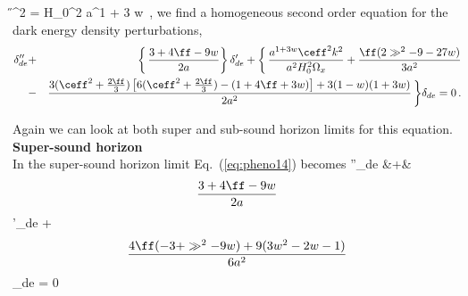 \be 
\H^2 = H_0^2  {a^{1 + 3 w}}\, ,
\ee 
we find a homogeneous second order equation for the dark energy density perturbations,
\begin{eqnarray}
\label{eq:pheno14}
\delta''_{de} &+&  \bigg\{\,  \frac{3 + 4 \ff - 9 w}{2 a}  \bigg\}\,   \delta'_{de}
+  \bigg\{\, \frac{a^{1 + 3 w} \ceff^2 k^2}{a^2 H_0^2 \Omega_x}  + \frac{\ff ( 2 \gg^2 - 9 - 27 w ) }{3a^2}
 \\ \nonumber
 &-& \frac{3 ( \ceff^2 + \frac{2 \ff}{3} ) \left[6 ( \ceff^2 + \frac{2 \ff}{3})  -  (1 + 4 \ff + 3 w) \right] + 3 (1 - w)(1 + 3 w) }{2 a^2}  \,\bigg\}
 \delta_{de} = 0 \, .
\end{eqnarray} 

Again we can look at both super and sub-sound horizon limits for this equation. \\

\noindent\textbf{Super-sound horizon}\\

In the super-sound horizon limit Eq.\ (\ref{eq:pheno14}) becomes
\be 
\delta''_{de} &+&  \[ \frac{3 + 4 \ff - 9 w}{2 a}  \] \delta'_{de} +  \[  \frac{4 \ff (-3 + \gg^2 - 9 w) + 9 ( 3 w^2 - 2 w - 1 )  }{6 a^2}  \] \delta_{de} = 0 
\label{eq:pheno15}
\ee

